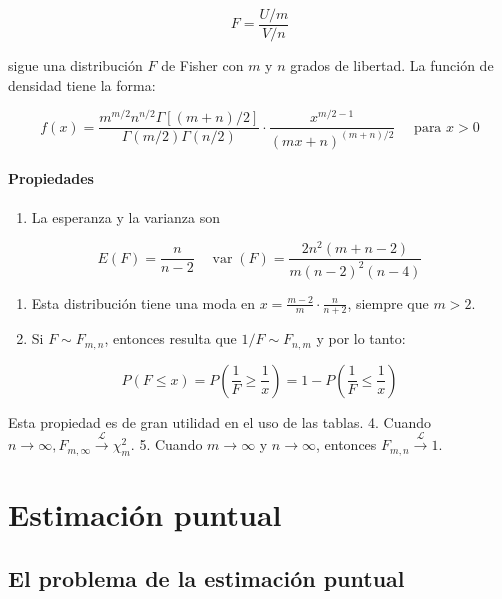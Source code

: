 \documentclass[
]{article}
\providecommand{\tightlist}{%
  \setlength{\itemsep}{0pt}\setlength{\parskip}{0pt}}
\begin{document}
\[
F=\frac{U / m}{V / n}
\]

sigue una distribución \(F\) de Fisher con \(m\) y \(n\) grados de libertad. La función de densidad tiene la forma:

\[
f(x)=\frac{m^{m / 2} n^{n / 2} \Gamma[(m+n) / 2]}{\Gamma(m / 2) \Gamma(n / 2)} \cdot \frac{x^{m / 2-1}}{(m x+n)^{(m+n) / 2}} \quad \text { para } x>0
\]

\paragraph{Propiedades}\label{propiedades-2}

\begin{enumerate}
\def\labelenumi{\arabic{enumi}.}
\tightlist
\item
  La esperanza y la varianza son
\end{enumerate}

\[
E(F)=\frac{n}{n-2} \quad \operatorname{var}(F)=\frac{2 n^{2}(m+n-2)}{m(n-2)^{2}(n-4)}
\]

\begin{enumerate}
\def\labelenumi{\arabic{enumi}.}
\setcounter{enumi}{1}
\tightlist
\item
  Esta distribución tiene una moda en \(x=\frac{m-2}{m} \cdot \frac{n}{n+2}\), siempre que \(m>2\).
\item
  Si \(F \sim F_{m, n}\), entonces resulta que \(1 / F \sim F_{n, m}\) y por lo tanto:
\end{enumerate}

\[
P(F \leq x)=P\left(\frac{1}{F} \geq \frac{1}{x}\right)=1-P\left(\frac{1}{F} \leq \frac{1}{x}\right)
\]

Esta propiedad es de gran utilidad en el uso de las tablas.
4. Cuando \(n \rightarrow \infty, F_{m, \infty} \xrightarrow{\mathcal{L}} \chi_{m}^{2}\).
5. Cuando \(m \rightarrow \infty\) y \(n \rightarrow \infty\), entonces \(F_{m, n} \xrightarrow{\mathcal{L}} 1\).

\section{Estimación puntual}\label{estimaciuxf3n-puntual}

\subsection{El problema de la estimación puntual}\label{el-problema-de-la-estimaciuxf3n-puntual}
\end{document}
